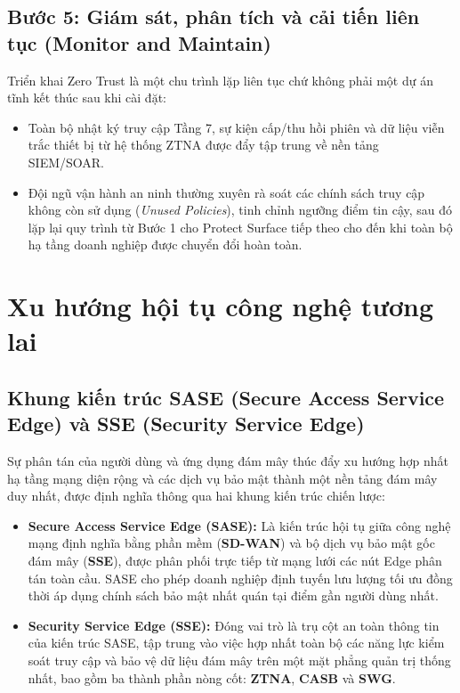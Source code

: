 \subsection{Bước 5: Giám sát, phân tích và cải tiến liên tục (Monitor and Maintain)}
\label{subsec:5_3_5}

Triển khai Zero Trust là một chu trình lặp liên tục chứ không phải một dự án tĩnh kết thúc sau khi cài đặt:
\begin{itemize}
    \item Toàn bộ nhật ký truy cập Tầng 7, sự kiện cấp/thu hồi phiên và dữ liệu viễn trắc thiết bị từ hệ thống ZTNA được đẩy tập trung về nền tảng SIEM/SOAR.
    \item Đội ngũ vận hành an ninh thường xuyên rà soát các chính sách truy cập không còn sử dụng (\textit{Unused Policies}), tinh chỉnh ngưỡng điểm tin cậy, sau đó lặp lại quy trình từ Bước 1 cho Protect Surface tiếp theo cho đến khi toàn bộ hạ tầng doanh nghiệp được chuyển đổi hoàn toàn.
\end{itemize}

\section{Xu hướng hội tụ công nghệ tương lai}
\label{sec:5_4}

\subsection{Khung kiến trúc SASE (Secure Access Service Edge) và SSE (Security Service Edge)}
\label{subsec:5_4_1}

Sự phân tán của người dùng và ứng dụng đám mây thúc đẩy xu hướng hợp nhất hạ tầng mạng diện rộng và các dịch vụ bảo mật thành một nền tảng đám mây duy nhất, được định nghĩa thông qua hai khung kiến trúc chiến lược:

\begin{itemize}
    \item \textbf{Secure Access Service Edge (SASE):} Là kiến trúc hội tụ giữa công nghệ mạng định nghĩa bằng phần mềm (\textbf{SD-WAN}) và bộ dịch vụ bảo mật gốc đám mây (\textbf{SSE}), được phân phối trực tiếp từ mạng lưới các nút Edge phân tán toàn cầu. SASE cho phép doanh nghiệp định tuyến lưu lượng tối ưu đồng thời áp dụng chính sách bảo mật nhất quán tại điểm gần người dùng nhất.
    \item \textbf{Security Service Edge (SSE):} Đóng vai trò là trụ cột an toàn thông tin của kiến trúc SASE, tập trung vào việc hợp nhất toàn bộ các năng lực kiểm soát truy cập và bảo vệ dữ liệu đám mây trên một mặt phẳng quản trị thống nhất, bao gồm ba thành phần nòng cốt: \textbf{ZTNA}, \textbf{CASB} và \textbf{SWG}.
\end{itemize}

